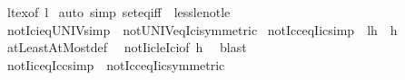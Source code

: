 \begin{isabellebody}
%
\isadelimproof
%
\endisadelimproof
%
\isatagproof
{}\isamarkupfalse%
\ lt{\isacharunderscore}{\kern0pt}ex{\isacharbrackleft}{\kern0pt}of\ l{\isacharprime}{\kern0pt}{\isacharbrackright}{\kern0pt}\ \isamarkupfalse%
{\isacharparenleft}{\kern0pt}auto\ simp{\isacharcolon}{\kern0pt}\ set{\isacharunderscore}{\kern0pt}eq{\isacharunderscore}{\kern0pt}iff\ \ less{\isacharunderscore}{\kern0pt}le{\isacharunderscore}{\kern0pt}not{\isacharunderscore}{\kern0pt}le{\isacharparenright}{\kern0pt}%
\endisatagproof
{\isafoldproof}%
%
\isadelimproof
\isanewline
%
\endisadelimproof
\isanewline
{}\isamarkupfalse%
\ not{\isacharunderscore}{\kern0pt}Ici{\isacharunderscore}{\kern0pt}eq{\isacharunderscore}{\kern0pt}UNIV{\isacharbrackleft}{\kern0pt}simp{\isacharbrackright}{\kern0pt}\ {\isacharequal}{\kern0pt}\ not{\isacharunderscore}{\kern0pt}UNIV{\isacharunderscore}{\kern0pt}eq{\isacharunderscore}{\kern0pt}Ici{\isacharbrackleft}{\kern0pt}symmetric{\isacharbrackright}{\kern0pt}\isanewline
\isanewline
{}\isamarkupfalse%
\ not{\isacharunderscore}{\kern0pt}Icc{\isacharunderscore}{\kern0pt}eq{\isacharunderscore}{\kern0pt}Iic{\isacharbrackleft}{\kern0pt}simp{\isacharbrackright}{\kern0pt}{\isacharcolon}{\kern0pt}\ {\isachardoublequoteopen}{\isasymnot}\ {\isacharbraceleft}{\kern0pt}l{\isachardot}{\kern0pt}{\isachardot}{\kern0pt}h{\isacharbraceright}{\kern0pt}\ {\isacharequal}{\kern0pt}\ {\isacharbraceleft}{\kern0pt}{\isachardot}{\kern0pt}{\isachardot}{\kern0pt}h{\isacharprime}{\kern0pt}{\isacharbraceright}{\kern0pt}{\isachardoublequoteclose}\isanewline
%
\isadelimproof
%
\endisadelimproof
%
\isatagproof
{}\isamarkupfalse%
\ atLeastAtMost{\isacharunderscore}{\kern0pt}def\ \isamarkupfalse%
\ not{\isacharunderscore}{\kern0pt}Iic{\isacharunderscore}{\kern0pt}le{\isacharunderscore}{\kern0pt}Ici{\isacharbrackleft}{\kern0pt}of\ h{\isacharprime}{\kern0pt}{\isacharbrackright}{\kern0pt}\ \isamarkupfalse%
\ blast%
\endisatagproof
{\isafoldproof}%
%
\isadelimproof
\isanewline
%
\endisadelimproof
\isanewline
{}\isamarkupfalse%
\ not{\isacharunderscore}{\kern0pt}Iic{\isacharunderscore}{\kern0pt}eq{\isacharunderscore}{\kern0pt}Icc{\isacharbrackleft}{\kern0pt}simp{\isacharbrackright}{\kern0pt}\ {\isacharequal}{\kern0pt}\ not{\isacharunderscore}{\kern0pt}Icc{\isacharunderscore}{\kern0pt}eq{\isacharunderscore}{\kern0pt}Iic{\isacharbrackleft}{\kern0pt}symmetric{\isacharbrackright}{\kern0pt}\isanewline
\isanewline
{}\isamarkupfalse%
\isanewline
\isanewline
\isanewline

\end{isabellebody}
